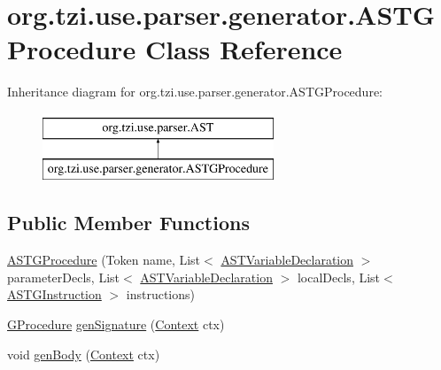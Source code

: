 \hypertarget{classorg_1_1tzi_1_1use_1_1parser_1_1generator_1_1_a_s_t_g_procedure}{\section{org.\-tzi.\-use.\-parser.\-generator.\-A\-S\-T\-G\-Procedure Class Reference}
\label{classorg_1_1tzi_1_1use_1_1parser_1_1generator_1_1_a_s_t_g_procedure}
}
Inheritance diagram for org.\-tzi.\-use.\-parser.\-generator.\-A\-S\-T\-G\-Procedure\-:\begin{figure}[H]
\begin{center}
\leavevmode
\includegraphics[height=2.000000cm]{classorg_1_1tzi_1_1use_1_1parser_1_1generator_1_1_a_s_t_g_procedure}
\end{center}
\end{figure}
\subsection*{Public Member Functions}
\begin{DoxyCompactItemize}
\item 
\hyperlink{classorg_1_1tzi_1_1use_1_1parser_1_1generator_1_1_a_s_t_g_procedure_ad76a523c68c2e50e59c4d886be5b591d}{A\-S\-T\-G\-Procedure} (Token name, List$<$ \hyperlink{classorg_1_1tzi_1_1use_1_1parser_1_1ocl_1_1_a_s_t_variable_declaration}{A\-S\-T\-Variable\-Declaration} $>$ parameter\-Decls, List$<$ \hyperlink{classorg_1_1tzi_1_1use_1_1parser_1_1ocl_1_1_a_s_t_variable_declaration}{A\-S\-T\-Variable\-Declaration} $>$ local\-Decls, List$<$ \hyperlink{classorg_1_1tzi_1_1use_1_1parser_1_1generator_1_1_a_s_t_g_instruction}{A\-S\-T\-G\-Instruction} $>$ instructions)
\item 
\hyperlink{classorg_1_1tzi_1_1use_1_1gen_1_1assl_1_1statics_1_1_g_procedure}{G\-Procedure} \hyperlink{classorg_1_1tzi_1_1use_1_1parser_1_1generator_1_1_a_s_t_g_procedure_aed363cc323e7f129a0aec18967acf261}{gen\-Signature} (\hyperlink{classorg_1_1tzi_1_1use_1_1parser_1_1_context}{Context} ctx)
\item 
void \hyperlink{classorg_1_1tzi_1_1use_1_1parser_1_1generator_1_1_a_s_t_g_procedure_a9fdc5064aa9aabfd85f50572ec638614}{gen\-Body} (\hyperlink{classorg_1_1tzi_1_1use_1_1parser_1_1_context}{Context} ctx)
\end{DoxyCompactItemize}


